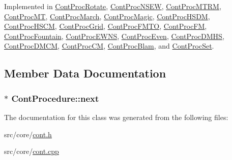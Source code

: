 Implemented in \hyperlink{a00081_a43308004b90299c4f06d4f7df29472ae}{Cont\-Proc\-Rotate}, \hyperlink{a00080_aa91db2ce7cb30ef776d9424f65c24db6}{Cont\-Proc\-N\-S\-E\-W}, \hyperlink{a00079_a7dbef5c4c51e4064a55efd9c3b4b8c45}{Cont\-Proc\-M\-T\-R\-M}, \hyperlink{a00078_a962aca7f48111ff35165fef9e30b7267}{Cont\-Proc\-M\-T}, \hyperlink{a00077_a98de0ad9854177887775bb191eb16ec4}{Cont\-Proc\-March}, \hyperlink{a00076_af65d4df561241982cdfda99425a6f42e}{Cont\-Proc\-Magic}, \hyperlink{a00075_acee31da94d32070ac68d5929c35851b4}{Cont\-Proc\-H\-S\-D\-M}, \hyperlink{a00074_ac601399766720bd99b7124dce80e91cf}{Cont\-Proc\-H\-S\-C\-M}, \hyperlink{a00073_a38f567fa3d7142ec6e5ca159e3a7a40d}{Cont\-Proc\-Grid}, \hyperlink{a00071_ae91ffc85c8a43412ee3164dd3c14be7d}{Cont\-Proc\-F\-M\-T\-O}, \hyperlink{a00070_afa13e90ef92926d841f8ccde4ffc28a6}{Cont\-Proc\-F\-M}, \hyperlink{a00072_a855a7fb74c148f0267862625fc4d3216}{Cont\-Proc\-Fountain}, \hyperlink{a00069_abf051788c6e6c552661a40f8179c11ee}{Cont\-Proc\-E\-W\-N\-S}, \hyperlink{a00068_afdf570f6d03a29b5743c4ecec8bbd416}{Cont\-Proc\-Even}, \hyperlink{a00066_aa12b04f473128f3d07139649ef944317}{Cont\-Proc\-D\-M\-H\-S}, \hyperlink{a00065_a90453323245d51cccd91dd50802e9f66}{Cont\-Proc\-D\-M\-C\-M}, \hyperlink{a00064_ae3d0ef74c8e17080072c537f29c17519}{Cont\-Proc\-C\-M}, \hyperlink{a00063_a049c64760a90035f4a4fadb1c190499e}{Cont\-Proc\-Blam}, and \hyperlink{a00082_a71bb8997d0068880ce828354ad0c8502}{Cont\-Proc\-Set}.



\subsection{Member Data Documentation}
\hypertarget{a00067_aac5b4a7edc2e4778ef7bb8dfed6ede8e}{
\subsubsection[{next}]{$\ast$ Cont\-Procedure\-::next}}\label{a00067_aac5b4a7edc2e4778ef7bb8dfed6ede8e}


The documentation for this class was generated from the following files\-:\begin{DoxyCompactItemize}
\item 
src/core/\hyperlink{a00218}{cont.\-h}\item 
src/core/\hyperlink{a00217}{cont.\-cpp}\end{DoxyCompactItemize}
